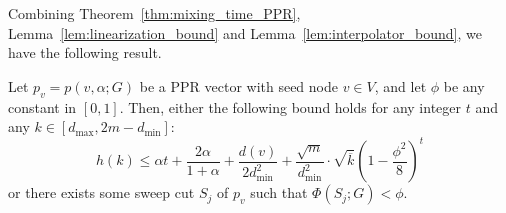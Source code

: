 \documentclass[11pt,twoside]{article}
\newcommand{\1}{\mathbbm{1}}
\begin{document}
Combining Theorem~\ref{thm:mixing_time_PPR}, Lemma~\ref{lem:linearization_bound} and Lemma~\ref{lem:interpolator_bound}, we have the following result.
\begin{corollary}
	\label{cor:mixing_time_PPR}
	Let $p_v = p(v,\alpha;G)$ be a PPR vector with seed node $v \in V$, and let $\phi$ be any constant in $[0,1]$. Then, either the following bound holds for any integer $t$ and any $k \in [d_{\max},2m - d_{\min}]$:
	\begin{equation*}
	h(k) \leq \alpha t + \frac{2\alpha}{1 + \alpha} + \frac{d(v)}{2d_{\min}^2} + \frac{\sqrt{m}}{d_{\min}^2} \cdot \sqrt{\overline{k}} \left(1 - \frac{\phi^2}{8}\right)^{t}
	\end{equation*}
	or there exists some sweep cut $S_j$ of $p_v$ such that $\Phi(S_j;G) < \phi$.
\end{corollary}
\end{document}
